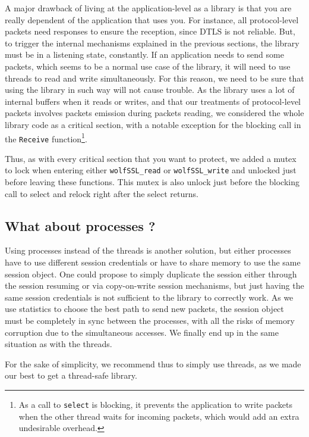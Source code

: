 A major drawback of living at the application-level as a library is that you are really dependent of the application that uses you. For instance, all protocol-level packets need responses to ensure the reception, since DTLS is not reliable. But, to trigger the internal mechanisms explained in the previous sections, the library must be in a listening state, constantly. If an application needs to send some packets, which seems to be a normal use case of the library, it will need to use threads to read and write simultaneously. For this reason, we need to be sure that using the library in such way will not cause trouble. As the library uses a lot of internal buffers when it reads or writes, and that our treatments of protocol-level packets involves packets emission during packets reading, we considered the whole library code as a critical section, with a notable exception for the blocking call in the \texttt{Receive} function\footnote{As a call to \texttt{select} is blocking, it prevents the application to write packets when the other thread waits for incoming packets, which would add an extra undesirable overhead.}.

Thus, as with every critical section that you want to protect, we added a mutex to lock when entering either \texttt{wolfSSL\_read} or \texttt{wolfSSL\_write} and unlocked just before leaving these functions. This mutex is also unlock just before the blocking call to select and relock right after the select returns.

\subsection{What about processes ?}

Using processes instead of the threads is another solution, but either processes have to use different session credentials or have to share memory to use the same session object. One could propose to simply duplicate the session either through the session resuming or via copy-on-write session mechanisms, but just having the same session credentials is not sufficient to the library to correctly work. As we use statistics to choose the best path to send new packets, the session object must be completely in sync between the processes, with all the risks of memory corruption due to the simultaneous accesses. We finally end up in the same situation as with the threads.

For the sake of simplicity, we recommend thus to simply use threads, as we made our best to get a thread-safe library.

